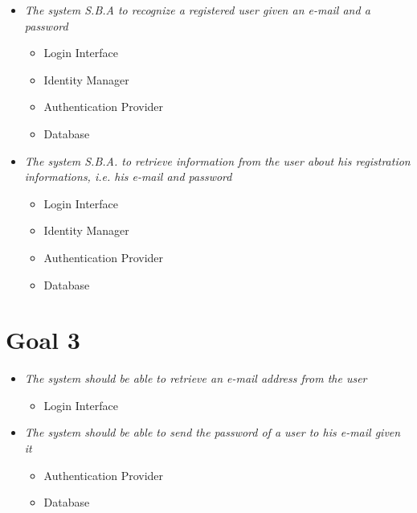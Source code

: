 \begin{itemize}

\item \textit{The system S.B.A to recognize a registered user given an e-mail and a password}

\begin{itemize}
\item Login Interface
\item Identity Manager
\item Authentication Provider
\item Database
\end{itemize}

\item \textit{The system S.B.A. to retrieve information from the user about his registration informations, i.e. his e-mail and password}

\begin{itemize}
\item Login Interface
\item Identity Manager
\item Authentication Provider
\item Database
\end{itemize}

\end{itemize}

\section{Goal 3}

\begin{itemize}

\item \textit{The system should be able to retrieve an e-mail address from the user}

\begin{itemize}
\item Login Interface
\end{itemize}

\item \textit{ The system should be able to send the password of a user to his e-mail given it}

\begin{itemize}
\item Authentication Provider
\item Database
\end{itemize}

\end{itemize}



